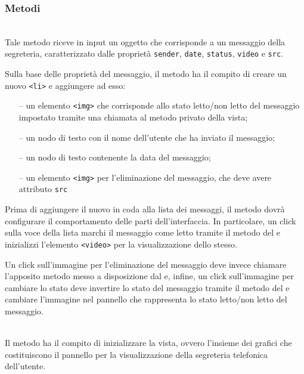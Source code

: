\subsubsection*{Metodi}
\begin{description}

\item{}\\
  Tale metodo riceve in input un oggetto che corrisponde a un messaggio della segreteria, caratterizzato dalle proprietà \verb'sender', \verb'date', \verb'status', \verb'video' e \verb'src'.
  
  Sulla base delle proprietà del messaggio, il metodo ha il compito di creare un nuovo \verb'<li>' e aggiungere ad esso:
  \begin{itemize}
    \item[--] un elemento \verb'<img>' che corrisponde allo stato letto/non letto del messaggio impostato tramite una chiamata al metodo privato  della vista;
    \item[--] un nodo di testo con il nome dell'utente che ha inviato il messaggio;
    \item[--] un nodo di testo contenente la data del messaggio;
    \item[--] un elemento \verb'<img>' per l'eliminazione del messaggio, che deve avere attributo \verb'src'
  \end{itemize}
  
  Prima di aggiungere il nuovo  in coda alla lista dei messaggi, il metodo dovrà configurare il comportamento delle parti dell'interfaccia. In particolare, un click sulla voce della lista marchi il messaggio come letto tramite il metodo  del  e inizializzi l'elemento \verb'<video>' per la visualizzazione dello stesso.
  
  Un click sull'immagine per l'eliminazione del messaggio deve invece chiamare l'apposito metodo  messo a disposizione dal  e, infine, un click sull'immagine per cambiare lo stato deve invertire lo stato del messaggio tramite il metodo  del  e cambiare l'immagine nel pannello che rappresenta lo stato letto/non letto del messaggio.

  \item{}\\
  Il metodo ha il compito di inizializzare la vista, ovvero l'insieme dei  grafici che costituiscono il pannello per la visualizzazione della segreteria telefonica dell'utente.
  

\end{description}
